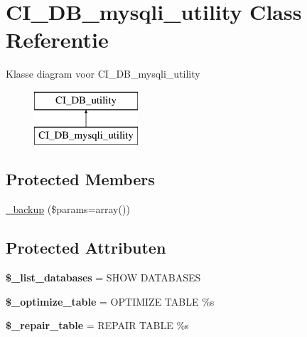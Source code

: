 \hypertarget{class_c_i___d_b__mysqli__utility}{}\section{C\+I\+\_\+\+D\+B\+\_\+mysqli\+\_\+utility Class Referentie}
\label{class_c_i___d_b__mysqli__utility}
Klasse diagram voor C\+I\+\_\+\+D\+B\+\_\+mysqli\+\_\+utility\begin{figure}[H]
\begin{center}
\leavevmode
\includegraphics[height=2.000000cm]{class_c_i___d_b__mysqli__utility}
\end{center}
\end{figure}
\subsection*{Protected Members}
\begin{DoxyCompactItemize}
\item 
\mbox{\hyperlink{class_c_i___d_b__mysqli__utility_a30f3053d2c82e7562349924363507afa}{\+\_\+backup}} (\$params=array())
\end{DoxyCompactItemize}
\subsection*{Protected Attributen}
\begin{DoxyCompactItemize}
\item 
\mbox{\label{class_c_i___d_b__mysqli__utility_afe3a5b80562d93d6bc7e2b53c95b7e5a}} 
{\bfseries \$\+\_\+list\+\_\+databases} = \textquotesingle{}S\+H\+OW D\+A\+T\+A\+B\+A\+S\+ES\textquotesingle{}
\item 
\mbox{\label{class_c_i___d_b__mysqli__utility_a083199e5c22c78912dae0a47bb2d7fad}} 
{\bfseries \$\+\_\+optimize\+\_\+table} = \textquotesingle{}O\+P\+T\+I\+M\+I\+ZE T\+A\+B\+LE \%s\textquotesingle{}
\item 
\mbox{\label{class_c_i___d_b__mysqli__utility_a5cf925cbd52e3f6ba5b7ada3fa436efc}} 
{\bfseries \$\+\_\+repair\+\_\+table} = \textquotesingle{}R\+E\+P\+A\+IR T\+A\+B\+LE \%s\textquotesingle{}
\end{DoxyCompactItemize}
